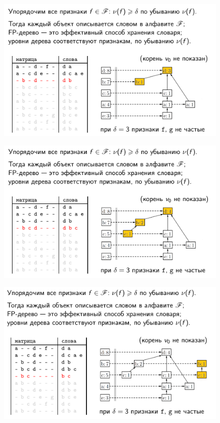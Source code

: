 \documentclass{beamer}
\begin{document}
\begin{frame}
	\begin{figure}[h]
		\centering
		\includegraphics[scale=0.45]{images/lec08-pic35.png}
	\end{figure}
\end{frame}

\begin{frame}
	\begin{figure}[h]
		\centering
		\includegraphics[scale=0.45]{images/lec08-pic36.png}
	\end{figure}
\end{frame}

\begin{frame}
	\begin{figure}[h]
		\centering
		\includegraphics[scale=0.45]{images/lec08-pic37.png}
	\end{figure}
\end{frame}
\end{document}

